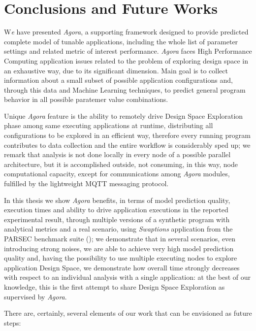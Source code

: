 \chapter{Conclusions and Future Works}\label{end}

\lettrine{W}{}\textit{e} have presented \textit{Agora}, a supporting framework designed to provide predicted complete model of tunable applications, including the whole list of parameter settings and related metric of interest performance. \textit{Agora} faces High Performance Computing application issues related to the problem of exploring design space in an exhaustive way, due to its significant dimension. Main goal is to collect information about a small subset of possible application configurations and, through this data and Machine Learning techniques, to predict general program behavior in all possible paratemer value combinations.

Unique \textit{Agora} feature is the ability to remotely drive Design Space Exploration phase among same executing applications at runtime, distributing all configurations to be explored in an efficient way, therefore every running program contributes to data collection and the entire workflow is considerably sped up; we remark that analysis is not done locally in every node of a possible parallel architecture, but it is accomplished outside, not consuming, in this way, node computational capacity, except for communications among \textit{Agora} modules, fulfilled by the lightweight MQTT messaging protocol.

In this thesis we show \textit{Agora} benefits, in terms of model prediction quality, execution times and ability to drive application executions in the reported experimental result, through multiple versions of a synthetic program with analytical metrics and a real scenario, using \textit{Swaptions} application from the PARSEC benchmark suite (\cite{bienia2008parsec}); we demonstrate that in several scenarios, even introducing strong noises, we are able to achieve very high model prediction quality and, having the possibility to use multiple executing nodes to explore application Design Space, we demonstrate how overall time strongly decreases with respect to an individual analysis with a single application: at the best of our knowledge, this is the first attempt to share Design Space Exploration as supervised by \textit{Agora}.

There are, certainly, several elements of our work that can be envisioned as future steps:

